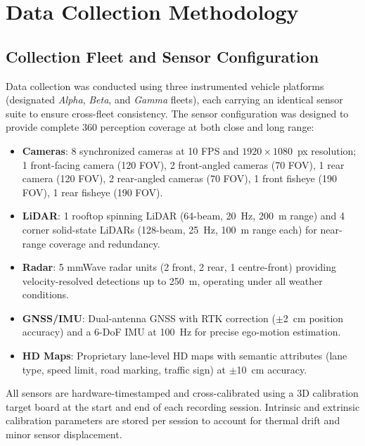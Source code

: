 \section{Data Collection Methodology}
\label{sec:collection}

\subsection{Collection Fleet and Sensor Configuration}
\label{ssec:sensor_config}

Data collection was conducted using three instrumented vehicle platforms (designated
\textit{Alpha}, \textit{Beta}, and \textit{Gamma} fleets), each carrying an identical
sensor suite to ensure cross-fleet consistency. The sensor configuration was designed
to provide complete 360\textdegree{} perception coverage at both close and long range:

\begin{itemize}[leftmargin=2em, noitemsep]
  \item \textbf{Cameras}: 8 synchronized cameras at 10 FPS and $1920 \times 1080$~px
        resolution; 1 front-facing camera (120\textdegree{} FOV), 2 front-angled cameras
        (70\textdegree{} FOV), 1 rear camera (120\textdegree{} FOV), 2 rear-angled cameras
        (70\textdegree{} FOV), 1 front fisheye (190\textdegree{} FOV), 1 rear fisheye
        (190\textdegree{} FOV).
  \item \textbf{LiDAR}: 1 rooftop spinning LiDAR (64-beam, 20~Hz, 200~m range) and
        4 corner solid-state LiDARs (128-beam, 25~Hz, 100~m range each) for near-range
        coverage and redundancy.
  \item \textbf{Radar}: 5 mmWave radar units (2 front, 2 rear, 1 centre-front) providing
        velocity-resolved detections up to 250~m, operating under all weather conditions.
  \item \textbf{GNSS/IMU}: Dual-antenna GNSS with RTK correction ($\pm$2~cm position accuracy)
        and a 6-DoF IMU at 100~Hz for precise ego-motion estimation.
  \item \textbf{HD Maps}: Proprietary lane-level HD maps with semantic attributes
        (lane type, speed limit, road marking, traffic sign) at $\pm$10~cm accuracy.
\end{itemize}

All sensors are hardware-timestamped and cross-calibrated using a 3D calibration target
board at the start and end of each recording session. Intrinsic and extrinsic calibration
parameters are stored per session to account for thermal drift and minor sensor displacement.

